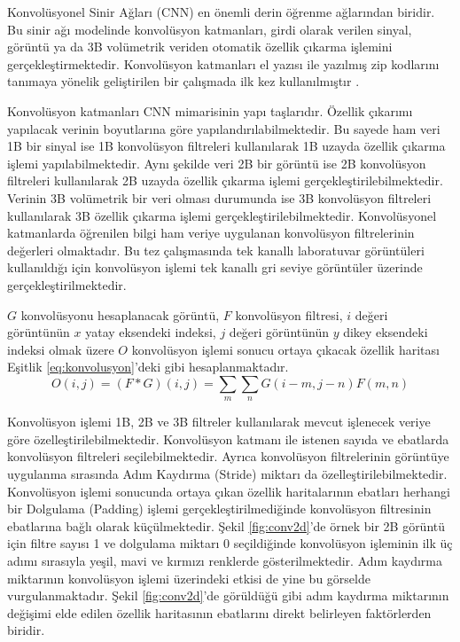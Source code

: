 Konvolüsyonel Sinir Ağları (CNN) en önemli derin öğrenme ağlarından biridir. Bu sinir ağı modelinde konvolüsyon katmanları, girdi olarak verilen sinyal, görüntü ya da 3B volümetrik veriden otomatik özellik çıkarma işlemini gerçekleştirmektedir. Konvolüsyon katmanları el yazısı ile yazılmış zip kodlarını tanımaya yönelik geliştirilen bir çalışmada ilk kez kullanılmıştır \cite{lecun1989backpropagation}.

Konvolüsyon katmanları CNN mimarisinin yapı taşlarıdır. Özellik çıkarımı yapılacak verinin boyutlarına göre yapılandırılabilmektedir. Bu sayede ham veri 1B bir sinyal ise 1B konvolüsyon filtreleri kullanılarak 1B uzayda özellik çıkarma işlemi yapılabilmektedir. Aynı şekilde veri 2B bir görüntü ise 2B konvolüsyon filtreleri kullanılarak 2B uzayda özellik çıkarma işlemi gerçekleştirilebilmektedir. Verinin 3B volümetrik bir veri olması durumunda ise 3B konvolüsyon filtreleri kullanılarak 3B özellik çıkarma işlemi gerçekleştirilebilmektedir. Konvolüsyonel katmanlarda öğrenilen bilgi ham veriye uygulanan konvolüsyon filtrelerinin değerleri olmaktadır. Bu tez çalışmasında tek kanallı laboratuvar görüntüleri kullanıldığı için konvolüsyon işlemi tek kanallı gri seviye görüntüler üzerinde gerçekleştirilmektedir.

$G$ konvolüsyonu hesaplanacak görüntü, $F$ konvolüsyon filtresi, $i$ değeri görüntünün $x$ yatay eksendeki indeksi, $j$ değeri görüntünün $y$ dikey eksendeki indeksi olmak üzere $O$ konvolüsyon işlemi sonucu ortaya çıkacak özellik haritası Eşitlik \ref{eq:konvolusyon}'deki gibi hesaplanmaktadır.
\begin{equation}
	\label{eq:konvolusyon}
	O(i, j)=(F * G)(i, j)=\sum_{m} \sum_{n} G(i-m, j-n) F(m, n)
\end{equation}

Konvolüsyon işlemi 1B, 2B ve 3B filtreler kullanılarak mevcut işlenecek veriye göre özelleştirilebilmektedir. Konvolüsyon katmanı ile istenen sayıda ve ebatlarda konvolüsyon filtreleri seçilebilmektedir. Ayrıca konvolüsyon filtrelerinin görüntüye uygulanma sırasında Adım Kaydırma (Stride) miktarı da özelleştirilebilmektedir. Konvolüsyon işlemi sonucunda ortaya çıkan özellik haritalarının ebatları herhangi bir Dolgulama (Padding) işlemi gerçekleştirilmediğinde konvolüsyon filtresinin ebatlarına bağlı olarak küçülmektedir. Şekil \ref{fig:conv2d}'de örnek bir 2B görüntü için filtre sayısı 1 ve dolgulama miktarı 0 seçildiğinde konvolüsyon işleminin ilk üç adımı sırasıyla yeşil, mavi ve kırmızı renklerde gösterilmektedir. Adım kaydırma miktarının konvolüsyon işlemi üzerindeki etkisi de yine bu görselde vurgulanmaktadır. Şekil \ref{fig:conv2d}'de görüldüğü gibi adım kaydırma miktarının değişimi elde edilen özellik haritasının ebatlarını direkt belirleyen faktörlerden biridir. 

